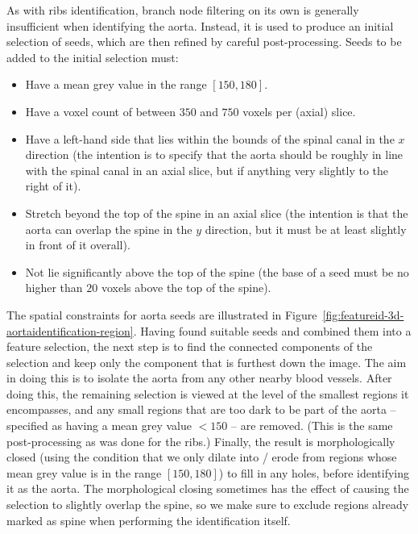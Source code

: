\noindent As with ribs identification, branch node filtering on its own is generally insufficient when identifying the aorta. Instead, it is used to produce an initial selection of seeds, which are then refined by careful post-processing. Seeds to be added to the initial selection must:
%
\begin{itemize}
\item Have a mean grey value in the range $[150,180]$.
\item Have a voxel count of between $350$ and $750$ voxels per (axial) slice.
\item Have a left-hand side that lies within the bounds of the spinal canal in the $x$ direction (the intention is to specify that the aorta should be roughly in line with the spinal canal in an axial slice, but if anything very slightly to the right of it).
\item Stretch beyond the top of the spine in an axial slice (the intention is that the aorta can overlap the spine in the $y$ direction, but it must be at least slightly in front of it overall).
\item Not lie significantly above the top of the spine (the base of a seed must be no higher than $20$ voxels above the top of the spine).
\end{itemize}
%
The spatial constraints for aorta seeds are illustrated in Figure~\ref{fig:featureid-3d-aortaidentification-region}. Having found suitable seeds and combined them into a feature selection, the next step is to find the connected components of the selection and keep only the component that is furthest down the image. The aim in doing this is to isolate the aorta from any other nearby blood vessels. After doing this, the remaining selection is viewed at the level of the smallest regions it encompasses, and any small regions that are too dark to be part of the aorta -- specified as having a mean grey value $< 150$ -- are removed. (This is the same post-processing as was done for the ribs.) Finally, the result is morphologically closed (using the condition that we only dilate into / erode from regions whose mean grey value is in the range $[150,180]$) to fill in any holes, before identifying it as the aorta. The morphological closing sometimes has the effect of causing the selection to slightly overlap the spine, so we make sure to exclude regions already marked as spine when performing the identification itself.

